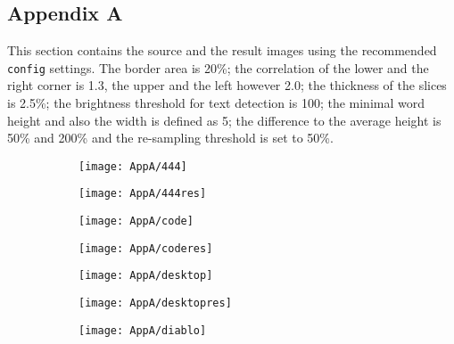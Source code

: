 \documentclass[draft,final]{vutinfth} %
\begin{document}
	\begin{appendices}
		\chapter{Appendix A}
		\label{AppA}
		This section contains the source and the result images using the recommended \texttt{config} settings.
		The border area is 20\%; the correlation of the lower and the right corner is 1.3, the upper and the left however 2.0; the thickness of the slices is 2.5\%; the brightness threshold for text detection is 100; the minimal word height and also the width is defined as 5; the difference to the average height is 50\% and 200\% and the re-sampling threshold is set to 50\%.
		
		\begin{figure}[H]
			\centering
			\begin{subfigure}[b]{0.45\columnwidth}
				\centering
				\texttt{[image: AppA/444]}
			\end{subfigure}
			\begin{subfigure}[b]{0.45\columnwidth}
				\centering
				\texttt{[image: AppA/444res]}
			\end{subfigure}
		\end{figure}  
		\begin{figure}[H]
		\centering
		\begin{subfigure}[b]{0.45\columnwidth}
			\centering
			\texttt{[image: AppA/code]}
		\end{subfigure}
		\begin{subfigure}[b]{0.45\columnwidth}
			\centering
			\texttt{[image: AppA/coderes]}
		\end{subfigure}
		\end{figure}
		\begin{figure}[H]
		\centering
		\begin{subfigure}[b]{0.45\columnwidth}
			\centering
			\texttt{[image: AppA/desktop]}
		\end{subfigure}
		\begin{subfigure}[b]{0.45\columnwidth}
			\centering
			\texttt{[image: AppA/desktopres]}
		\end{subfigure}
		\end{figure}
		\begin{figure}[H]
		\centering
		\begin{subfigure}[b]{0.45\columnwidth}
			\centering
			\texttt{[image: AppA/diablo]}

\end{subfigure}
\end{figure}
\end{appendices}
\end{document}
